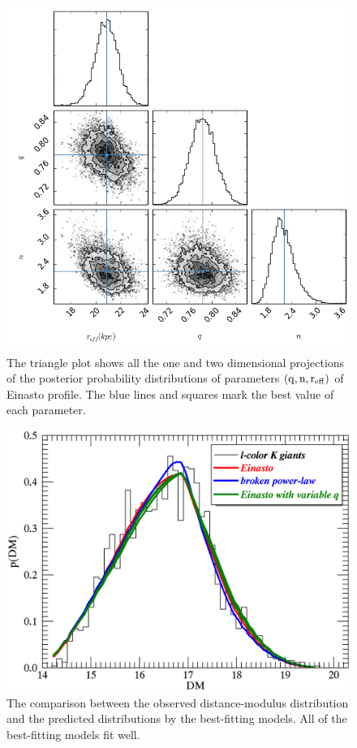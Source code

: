 \documentclass[12pt,preprint]{aastex}
\begin{document}
\begin{figure}[htbp]
\centering
\includegraphics[width=\textwidth]{triangleeinasto}
\caption{The triangle plot shows all the one and two dimensional projections of the posterior probability distributions of parameters $\rm (q,n,r_{eff})$ of Einasto profile. The blue lines and squares mark the best value of each parameter.}
\label{f:feinasto}
\end{figure}
\begin{figure}[htbp]
\centering
\includegraphics[width=\textwidth]{pdm_hptest_allmodels}
\caption{The comparison between the observed distance-modulus distribution and the predicted distributions by the best-fitting models. All of the best-fitting models fit well.}
\label{f:fpdm}
\end{figure}
\end{document}
